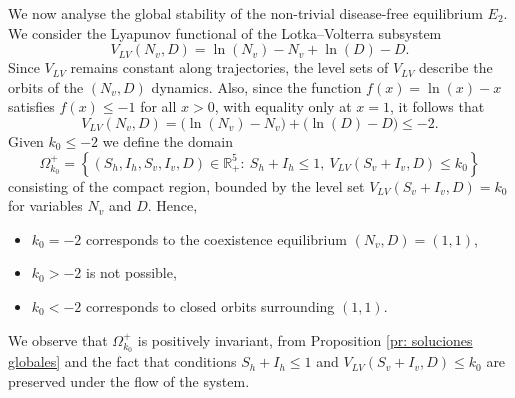 \documentclass{amsart}
\theoremstyle{definition}
\theoremstyle{remark}
\numberwithin{equation}{section}
\begin{document}
We now analyse the global stability of the non-trivial disease-free equilibrium $E_2$.
We consider the Lyapunov functional of the Lotka--Volterra subsystem
$$
V_{LV}(N_v,D) = \ln(N_v)-N_v+ \ln(D)-D.
$$
Since $V_{LV}$ remains constant along trajectories, the level sets of $V_{LV}$ describe the orbits of the $(N_v,D)$ dynamics. 
Also, since the function $f(x)=\ln(x)-x$ satisfies $f(x)\leq -1$ for all $x>0$, with equality only at $x=1$, it follows that
$$
V_{LV}(N_v,D) = \big(\ln(N_v)-N_v\big)+\big(\ln(D)-D\big) \leq -2.
$$
Given $k_0\leq -2$ we define the domain 
\[
\Omega^+_{k_0}=\left\{ (S_h,I_h,S_v,I_v,D)\in \mathbb{R}^5_+: \ S_h+I_h\leq 1,\ 
V_{LV}(S_v+I_v,D) \leq k_0 \right\}
\]
consisting of the compact region, bounded by the level set $V_{LV}(S_v+I_v,D) = k_0$ for variables $N_v$ and $D$.
Hence,
\begin{itemize}
	\item $k_0=-2$ corresponds to the coexistence equilibrium $(N_v,D)=(1,1)$,
	\item $k_0>-2$ is not possible,
	\item $k_0<-2$ corresponds to closed orbits surrounding $(1,1)$.
\end{itemize}

We observe that $\Omega^+_{k_0}$ is positively invariant, from Proposition \ref{pr: soluciones globales} and the fact that conditions $S_h+I_h\leq 1$ and $V_{LV}(S_v+I_v,D)\leq k_0$ are preserved under the flow of the system.
\end{document}
